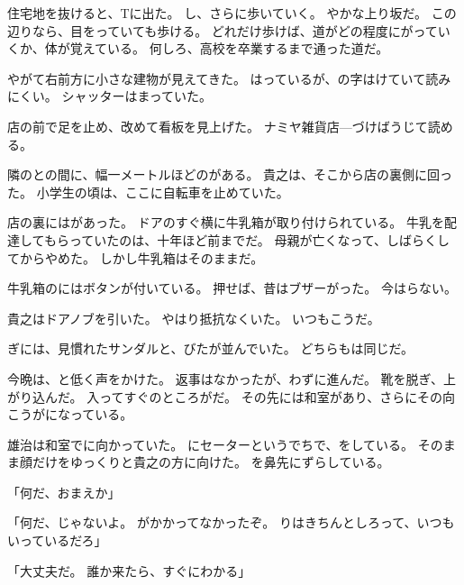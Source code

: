 \documentclass[chapter3.tex]{subfiles}
\begin{document}
\begin{CJK}{UTF8}{ipxm}
    住宅地を抜けると、Tに出た。
    し、さらに歩いていく。
    やかな上り坂だ。
    この辺りなら、目をっていても歩ける。
    どれだけ歩けば、道がどの程度にがっていくか、体が覚えている。
    何しろ、高校を卒業するまで通った道だ。

    やがて右前方に小さな建物が見えてきた。
    はっているが、の字はけていて読みにくい。
    シャッターはまっていた。

    店の前で足を止め、改めて看板を見上げた。
    ナミヤ雑貨店---づけばうじて読める。

    隣のとの間に、幅一メートルほどのがある。
    貴之は、そこから店の裏側に回った。
    小学生の頃は、ここに自転車を止めていた。

    店の裏にはがあった。
    ドアのすぐ横に牛乳箱が取り付けられている。
    牛乳を配達してもらっていたのは、十年ほど前までだ。
    母親が亡くなって、しばらくしてからやめた。
    しかし牛乳箱はそのままだ。

    牛乳箱のにはボタンが付いている。
    押せば、昔はブザーがった。
    今はらない。

    貴之はドアノブを引いた。
    やはり抵抗なくいた。
    いつもこうだ。

    ぎには、見慣れたサンダルと、びたが並んでいた。
    どちらもは同じだ。

    今晩は、と低く声をかけた。
    返事はなかったが、わずに進んだ。
    靴を脱ぎ、上がり込んだ。
    入ってすぐのところがだ。
    その先には和室があり、さらにその向こうがになっている。

    雄治は和室でに向かっていた。
    にセーターというでちで、をしている。
    そのまま顔だけをゆっくりと貴之の方に向けた。
    を鼻先にずらしている。

    「何だ、おまえか」

    「何だ、じゃないよ。
    がかかってなかったぞ。
    りはきちんとしろって、いつもいっているだろ」

    「大丈夫だ。
    誰か来たら、すぐにわかる」


\end{CJK}
\end{document}
